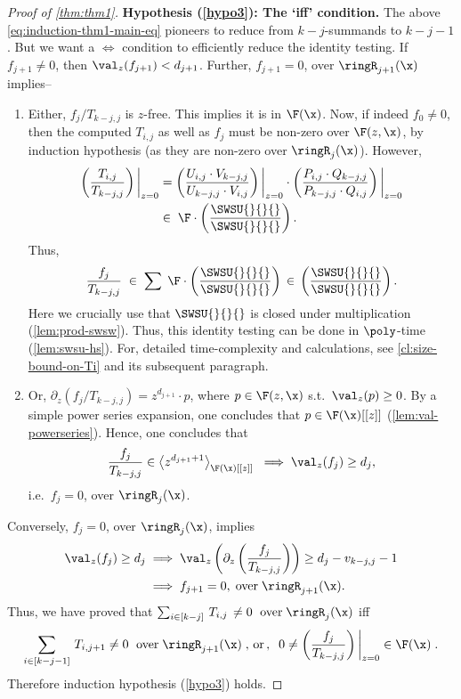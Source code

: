 \begin{proof}[Proof of \autoref{thm:thm1}]
\noindent \textbf{Hypothesis (\ref{hypo3}): The `iff' condition.} The above \autoref{eq:induction-thm1-main-eq} pioneers to reduce from $k-j$-summands to $k-j-1$. But we want a $\iff$ condition to efficiently reduce the identity testing. If $f_{j+1} \ne 0$, then $\val_{z}(f_{j+1}) < d_{j+1}$.  Further, $f_{j+1} = 0$, over $\ringR_{j+1}(\x)$ implies--
\begin{enumerate}
    \item Either, $f_j/T_{k-j,j}$ is $z$-free. This implies it is in $\F(\x)$. Now, if indeed $f_0 \ne 0$, then the computed $T_{i,j}$ as well as $f_j$ must be non-zero over $\F(z,\x)$, by induction hypothesis (as they are non-zero over $\ringR_j(\x)$).  However,
    \begin{align*}
    \left(\frac{T_{i,j}}{T_{k-j,j}}\right) \bigg\rvert_{z=0} &= \left( \frac{U_{i,j} \cdot V_{k-j,j}}{U_{k-j,j} \cdot V_{i,j}} \right) \bigg\rvert_{z=0} \cdot \left( \frac{P_{i,j} \cdot Q_{k-j,j}}{P_{k-j,j} \cdot Q_{i,j}} \right) \bigg\rvert_{z=0} \\ & \in\; \F \cdot \left( \frac{\SWSU{}{}{}}{\SWSU{}{}{}} \right).
    \end{align*} Thus, \[ \frac{f_j}{T_{k-j,j}} \; \in \; \sum \;  \F \cdot \left( \frac{\SWSU{}{}{}}{\SWSU{}{}{}} \right) \,\in\,  \left( \frac{\SWSU{}{}{}}{\SWSU{}{}{}} \right).\] Here we crucially use that $\SWSU{}{}{}$ is closed under multiplication (\autoref{lem:prod-swsw}). 
%
    Thus, this identity testing can be done in $\poly$-time (\autoref{lem:swsu-hs}).  For, detailed time-complexity and calculations, see \autoref{cl:size-bound-on-Ti} and its subsequent paragraph. \smallskip 
    \item Or, $\partial_{z}(f_j/T_{k-j,j}) = z^{d_{j+1}} \cdot p$, where $p \in \F(z,\x)$ s.t.~$\val_{z}(p) \ge 0$. By a simple power series expansion, one concludes that $p \in \F(\x)[[z]]$ (\autoref{lem:val-powerseries}). Hence, one concludes that \[ \frac{f_j}{T_{k-j,j}} \in  \left\langle z^{d_{j+1}+1}\right\rangle_{\F(\x)[[z]]}\; \implies \val_{z}(f_j) \ge d_j,\] i.e.~$f_j = 0$, over $\ringR_j(\x)$.
\end{enumerate}

\medskip
Conversely, $f_j=0$, over $\ringR_j(\x)$, implies \begin{align*}\val_{z}(f_j) \ge d_j &\implies \val_{z} \left( \partial_{z}\left( \frac{f_j}{T_{k-j,j}} \right) \right) \ge d_j-v_{k-j,j}-1 \\ &\implies f_{j+1}=0, \; \text{over} \; \ringR_{j+1}(\x).\end{align*}
Thus, we have proved that $\sum_{i \in [k-j]}\,T_{i,j}\,\ne 0 \;\text{ over}\;\ringR_j(\x)$ iff \[\sum_{i \in [k-j-1]}\, T_{i,j+1} \ne 0 \;\text{ over} \;\ringR_{j+1}(\x)\;,\,\text{or}\,,\;\;0 \ne \left( \frac{f_j}{T_{k-j,j}} \right)\bigg\rvert_{z=0} \in \F(\x)\;.\]
Therefore induction hypothesis (\ref{hypo3}) holds. 


\end{proof}
